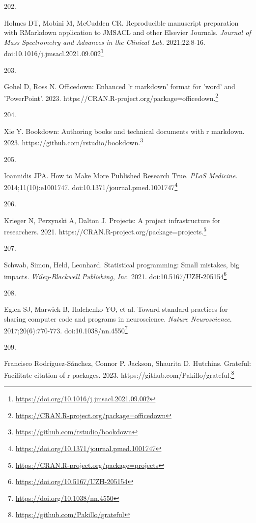 \documentclass[
  a4paper,
]{book}
\newlength{\cslhangindent}
\newlength{\csllabelwidth}
\newlength{\cslentryspacingunit} %
\newenvironment{CSLReferences}[2] %
 {%
  \setlength{\parindent}{0pt}
  \ifodd #1
  \let\oldpar\par
  \def\par{\hangindent=\cslhangindent\oldpar}
  \fi
  \setlength{\parskip}{#2\cslentryspacingunit}
 }%
 {}
\newcommand{\CSLLeftMargin}[1]{\parbox[t]{\csllabelwidth}{#1}}
\newcommand{\CSLRightInline}[1]{\parbox[t]{\linewidth - \csllabelwidth}{#1}\break}
\renewcommand{\href}[2]{#2\footnote{\url{#1}}}
\begin{document}
\begin{CSLReferences}{0}{0}
\leavevmode{}%
\CSLLeftMargin{202. }%
\CSLRightInline{Holmes DT, Mobini M, McCudden CR. Reproducible manuscript preparation with RMarkdown application to JMSACL and other Elsevier Journals. \emph{Journal of Mass Spectrometry and Advances in the Clinical Lab}. 2021;22:8-16. doi:\href{https://doi.org/10.1016/j.jmsacl.2021.09.002}{10.1016/j.jmsacl.2021.09.002}}

\leavevmode{}%
\CSLLeftMargin{203. }%
\CSLRightInline{Gohel D, Ross N. Officedown: Enhanced 'r markdown' format for 'word' and 'PowerPoint'. 2023. \href{https://CRAN.R-project.org/package=officedown}{https://CRAN.R-project.org/package=officedown.}}

\leavevmode{}%
\CSLLeftMargin{204. }%
\CSLRightInline{Xie Y. Bookdown: Authoring books and technical documents with r markdown. 2023. \href{https://github.com/rstudio/bookdown}{https://github.com/rstudio/bookdown.}}

\leavevmode{}%
\CSLLeftMargin{205. }%
\CSLRightInline{Ioannidis JPA. How to Make More Published Research True. \emph{PLoS Medicine}. 2014;11(10):e1001747. doi:\href{https://doi.org/10.1371/journal.pmed.1001747}{10.1371/journal.pmed.1001747}}

\leavevmode{}%
\CSLLeftMargin{206. }%
\CSLRightInline{Krieger N, Perzynski A, Dalton J. Projects: A project infrastructure for researchers. 2021. \href{https://CRAN.R-project.org/package=projects}{https://CRAN.R-project.org/package=projects.}}

\leavevmode{}%
\CSLLeftMargin{207. }%
\CSLRightInline{Schwab, Simon, Held, Leonhard. Statistical programming: Small mistakes, big impacts. \emph{Wiley-Blackwell Publishing, Inc}. 2021. doi:\href{https://doi.org/10.5167/UZH-205154}{10.5167/UZH-205154}}

\leavevmode{}%
\CSLLeftMargin{208. }%
\CSLRightInline{Eglen SJ, Marwick B, Halchenko YO, et al. Toward standard practices for sharing computer code and programs in neuroscience. \emph{Nature Neuroscience}. 2017;20(6):770-773. doi:\href{https://doi.org/10.1038/nn.4550}{10.1038/nn.4550}}

\leavevmode{}%
\CSLLeftMargin{209. }%
\CSLRightInline{Francisco Rodríguez-Sánchez, Connor P. Jackson, Shaurita D. Hutchins. Grateful: Facilitate citation of r packages. 2023. \href{https://github.com/Pakillo/grateful}{https://github.com/Pakillo/grateful.}}


\end{CSLReferences}
\end{document}
